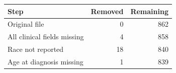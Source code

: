 \begin{tabular}{lrr}
\toprule
\textbf{Step} & \textbf{Removed} & \textbf{Remaining} \\
\midrule
Original file & 0 & 862 \\
All clinical fields missing & 4 & 858 \\
Race not reported & 18 & 840 \\
Age at diagnosis missing & 1 & 839 \\
\bottomrule
\end{tabular}

